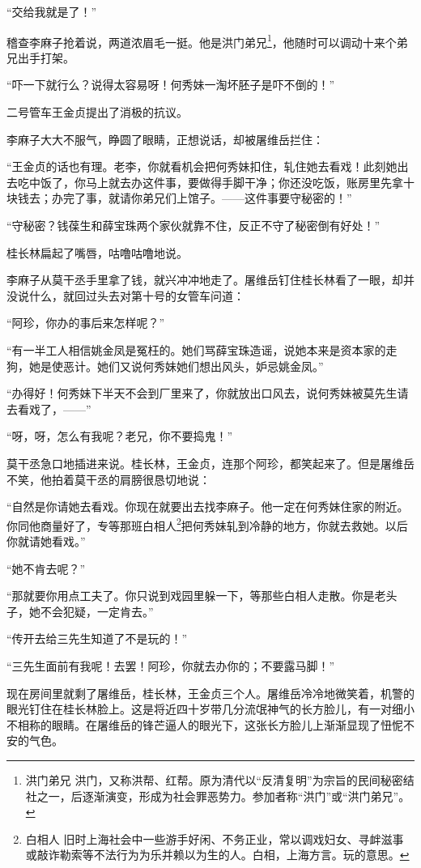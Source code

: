 \par “交给我就是了！”
\par 稽查李麻子抢着说，两道浓眉毛一挺。他是洪门弟兄\footnote{洪门弟兄 洪门，又称洪帮、红帮。原为清代以“反清复明”为宗旨的民间秘密结社之一，后逐渐演变，形成为社会罪恶势力。参加者称“洪门”或“洪门弟兄”。}，他随时可以调动十来个弟兄出手打架。
\par “吓一下就行么？说得太容易呀！何秀妹一淘坏胚子是吓不倒的！”
\par 二号管车王金贞提出了消极的抗议。
\par 李麻子大大不服气，睁圆了眼睛，正想说话，却被屠维岳拦住：
\par “王金贞的话也有理。老李，你就看机会把何秀妹扣住，轧住她去看戏！此刻她出去吃中饭了，你马上就去办这件事，要做得手脚干净；你还没吃饭，账房里先拿十块钱去；办完了事，就请你弟兄们上馆子。——这件事要守秘密的！”
\par “守秘密？钱葆生和薛宝珠两个家伙就靠不住，反正不守了秘密倒有好处！”
\par 桂长林扁起了嘴唇，咕噜咕噜地说。
\par 李麻子从莫干丞手里拿了钱，就兴冲冲地走了。屠维岳钉住桂长林看了一眼，却并没说什么，就回过头去对第十号的女管车问道：
\par “阿珍，你办的事后来怎样呢？”
\par “有一半工人相信姚金凤是冤枉的。她们骂薛宝珠造谣，说她本来是资本家的走狗，她是使恶计。她们又说何秀妹她们想出风头，妒忌姚金凤。”
\par “办得好！何秀妹下半天不会到厂里来了，你就放出口风去，说何秀妹被莫先生请去看戏了，——”
\par “呀，呀，怎么有我呢？老兄，你不要捣鬼！”
\par 莫干丞急口地插进来说。桂长林，王金贞，连那个阿珍，都笑起来了。但是屠维岳不笑，他拍着莫干丞的肩膀很恳切地说：
\par “自然是你请她去看戏。你现在就要出去找李麻子。他一定在何秀妹住家的附近。你同他商量好了，专等那班白相人\footnote{白相人 旧时上海社会中一些游手好闲、不务正业，常以调戏妇女、寻衅滋事或敲诈勒索等不法行为为乐并赖以为生的人。白相，上海方言。玩的意思。}把何秀妹轧到冷静的地方，你就去救她。以后你就请她看戏。”
\par “她不肯去呢？”
\par “那就要你用点工夫了。你只说到戏园里躲一下，等那些白相人走散。你是老头子，她不会犯疑，一定肯去。”
\par “传开去给三先生知道了不是玩的！”
\par “三先生面前有我呢！去罢！阿珍，你就去办你的；不要露马脚！”
\par 现在房间里就剩了屠维岳，桂长林，王金贞三个人。屠维岳冷冷地微笑着，机警的眼光钉住在桂长林脸上。这是将近四十岁带几分流氓神气的长方脸儿，有一对细小不相称的眼睛。在屠维岳的锋芒逼人的眼光下，这张长方脸儿上渐渐显现了忸怩不安的气色。
